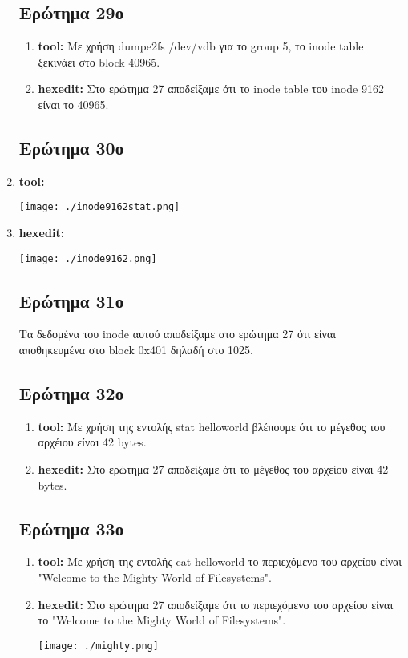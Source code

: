 \documentclass{article}
\begin{document}
\begin{enumerate}
\subsection{Ερώτημα 29ο}
\begin{enumerate}
    \item{\textbf{tool:} Με χρήση dumpe2fs /dev/vdb για το group 5, το inode table ξεκινάει στο block 40965.}
    \item{\textbf{hexedit:} Στο ερώτημα 27 αποδείξαμε ότι το inode table του inode 9162 είναι το 40965.}
\end{enumerate}

\subsection{Ερώτημα 30ο}
    \item{\textbf{tool:}
            \begin{center}
                \texttt{[image: ./inode9162stat.png]}
        \end{center}}
    \item{\textbf{hexedit:}
            \begin{center}
                \texttt{[image: ./inode9162.png]}
        \end{center}}
\subsection{Ερώτημα 31ο}
Τα δεδομένα του inode αυτού αποδείξαμε στο ερώτημα 27 ότι είναι αποθηκευμένα στο block 0x401 δηλαδή στο 1025.\\
\subsection{Ερώτημα 32ο}
\begin{enumerate}
    \item{\textbf{tool:} Με χρήση της εντολής stat helloworld βλέπουμε ότι το μέγεθος του αρχέιου είναι 42 bytes.}
    \item{\textbf{hexedit:} Στο ερώτημα 27 αποδείξαμε ότι το μέγεθος του αρχείου είναι 42 bytes.}
\end{enumerate}


\subsection{Ερώτημα 33ο}
\begin{enumerate}
    \item{\textbf{tool:} Με χρήση της εντολής cat helloworld το περιεχόμενο του αρχείου είναι "Welcome 
        to the Mighty World of Filesystems".}
    \item{\textbf{hexedit:} Στο ερώτημα 27 αποδείξαμε ότι το περιεχόμενο του αρχείου είναι το "Welcome to the Mighty 
        World of Filesystems".\\
        \begin{center}
                \texttt{[image: ./mighty.png]}
        \end{center}}
\end{enumerate}


\end{enumerate}
\end{document}
